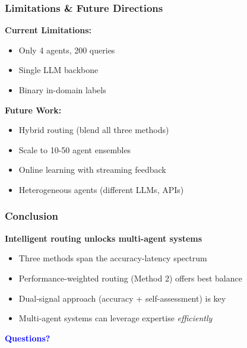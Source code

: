 \documentclass{beamer}
\begin{document}
\begin{frame}
\frametitle{Limitations \& Future Directions}
\textbf{Current Limitations:}
\begin{itemize}
    \item Only 4 agents, 200 queries
    \item Single LLM backbone
    \item Binary in-domain labels
\end{itemize}

\pause

\textbf{Future Work:}
\begin{itemize}
    \item Hybrid routing (blend all three methods)
    \item Scale to 10-50 agent ensembles
    \item Online learning with streaming feedback
    \item Heterogeneous agents (different LLMs, APIs)
\end{itemize}
\end{frame}

\begin{frame}
\frametitle{Conclusion}
\begin{center}
    \Large \textbf{Intelligent routing unlocks multi-agent systems}
\end{center}

\vspace{0.3cm}

\begin{itemize}
    \item Three methods span the accuracy-latency spectrum
    \pause
    \item Performance-weighted routing (Method 2) offers best balance
    \pause
    \item Dual-signal approach (accuracy + self-assessment) is key
    \pause
    \item Multi-agent systems can leverage expertise \textit{efficiently}
\end{itemize}

\vspace{0.5cm}

\begin{center}
    \Large \textcolor{blue}{\textbf{Questions?}}
\end{center}
\end{frame}
\end{document}

